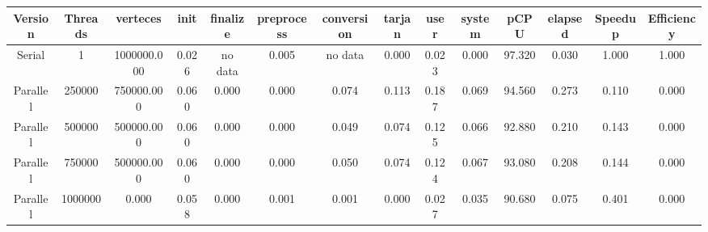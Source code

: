 \begin{tabular}{|c|c|c|c|c|c|c|c|c|c|c|c|c|c|}
\toprule
 Version &  Threads &    verteces &  init & finalize &  preprocess & conversion &  tarjan &  user &  system &   pCPU &  elapsed &  Speedup &  Efficiency \\
\midrule
  Serial &        1 & 1000000.000 & 0.026 &  no data &       0.005 &    no data &   0.000 & 0.023 &   0.000 & 97.320 &    0.030 &    1.000 &       1.000 \\
Parallel &   250000 &  750000.000 & 0.060 &    0.000 &       0.000 &      0.074 &   0.113 & 0.187 &   0.069 & 94.560 &    0.273 &    0.110 &       0.000 \\
Parallel &   500000 &  500000.000 & 0.060 &    0.000 &       0.000 &      0.049 &   0.074 & 0.125 &   0.066 & 92.880 &    0.210 &    0.143 &       0.000 \\
Parallel &   750000 &  500000.000 & 0.060 &    0.000 &       0.000 &      0.050 &   0.074 & 0.124 &   0.067 & 93.080 &    0.208 &    0.144 &       0.000 \\
Parallel &  1000000 &       0.000 & 0.058 &    0.000 &       0.001 &      0.001 &   0.000 & 0.027 &   0.035 & 90.680 &    0.075 &    0.401 &       0.000 \\
\bottomrule
\end{tabular}

